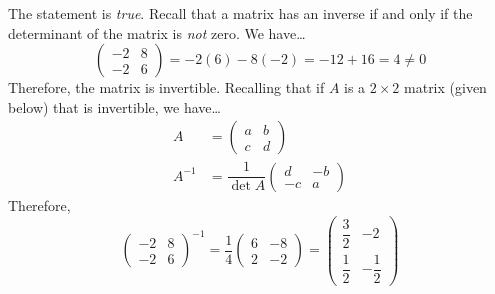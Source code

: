 \documentclass[11pt,letterpaper]{article}
\begin{document}
\sol The statement is \textit{true}. Recall that a matrix has an inverse if and only if the determinant of the matrix is \textit{not} zero. We have\dots
	\[
	\begin{pmatrix} -2 & 8 \\ -2 & 6 \end{pmatrix}= -2(6) - 8(-2)= -12 + 16= 4 \neq 0
	\]
Therefore, the matrix is invertible. Recalling that if $A$ is a $2 \times 2$ matrix (given below) that is invertible, we have\dots
	\[
	\begin{aligned}
	A&= 
	\begin{pmatrix}
	a & b \\ 
	c & d
	\end{pmatrix} \\
	A^{-1}&= \dfrac{1}{\det A}
	\begin{pmatrix}
	d & -b \\
	-c & a 
	\end{pmatrix}
	\end{aligned}
	\]
Therefore, 
	\[
	\begin{pmatrix} -2 & 8 \\ -2 & 6 \end{pmatrix}^{-1}= \dfrac{1}{4} \begin{pmatrix} 6 & -8 \\ 2 & -2 \end{pmatrix}= \begin{pmatrix} \dfrac{3}{2} & -2 \\[0.3cm] \dfrac{1}{2} & -\dfrac{1}{2} \end{pmatrix}
	\]
\end{document}
